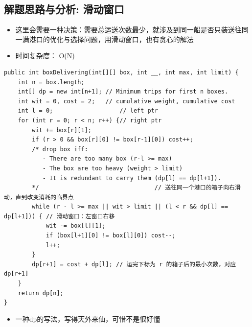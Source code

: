 \documentclass[9pt, b5paaper]{book}
\begin{document}
\subsection{解题思路与分析: 滑动窗口}
\label{sec-12-7-1}
\begin{itemize}
\item 这里会需要一种决策：需要总运送次数最少，就涉及到同一船是否只装送往同一满港口的优化与选择问题，用滑动窗口，也有贪心的解法
\item 时间复杂度： O(N)
\end{itemize}
\begin{verbatim}
public int boxDelivering(int[][] box, int __, int max, int limit) {
    int n = box.length;
    int[] dp = new int[n+1]; // Minimum trips for first n boxes.
    int wit = 0, cost = 2;   // cumulative weight, cumulative cost
    int l = 0;                   // left ptr
    for (int r = 0; r < n; r++) {// right ptr
        wit += box[r][1];
        if (r > 0 && box[r][0] != box[r-1][0]) cost++;
        /* drop box iff:
           - There are too many box (r-l >= max)
           - The box are too heavy (weight > limit)
           - It is redundant to carry them (dp[l] == dp[l+1]).
        */                                 // 送往同一个港口的箱子向右滑动，直到改变消耗的临界点
        while (r - l >= max || wit > limit || (l < r && dp[l] == dp[l+1])) { // 滑动窗口：左窗口右移
            wit -= box[l][1];
            if (box[l+1][0] != box[l][0]) cost--;
            l++;
        }
        dp[r+1] = cost + dp[l]; // 运完下标为 r 的箱子后的最小次数，对应 dp[r+1]
    }
    return dp[n];
}
\end{verbatim}
\begin{itemize}
\item 一种dp的写法，写得天外来仙，可惜不是很好懂
\end{itemize}
\end{document}
